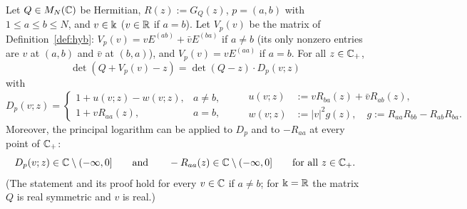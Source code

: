 \begin{lemma}\label{lem:det}
Let $Q\in M_N(\mathbb{C})$ be Hermitian, $R(z):=G_Q(z)$, $p=(a,b)$ with $1\le a\le b\le N$, and $v\in\Bbbk$ ($v\in\mathbb{R}$ if $a=b$). Let $V_p(v)$ be the matrix of
Definition~\ref{def:hyb}: $V_p(v)=vE^{(ab)}+\bar vE^{(ba)}$ if $a\ne b$ (its only nonzero entries are $v$ at $(a,b)$ and $\bar v$ at $(b,a)$), and
$V_p(v)=vE^{(aa)}$ if $a=b$. For all $z\in\mathbb{C}_+$,
\[
\det(Q+V_p(v)-z)=\det(Q-z)\cdot D_p(v;z)
\]
with
\[
D_p(v;z)=\begin{cases}1+u(v;z)-w(v;z),& a\ne b,\\ 1+vR_{aa}(z),& a=b,\end{cases}\qquad
\begin{aligned}u(v;z)&:=vR_{ba}(z)+\bar vR_{ab}(z),\\ w(v;z)&:=|v|^2g(z),\quad g:=R_{aa}R_{bb}-R_{ab}R_{ba}.\end{aligned}
\]
Moreover, the principal logarithm can be applied to $D_p$ and to $-R_{aa}$ at every point of $\mathbb{C}_+$:
\begin{equation}\label{eq:b1:nocut}
D_p(v;z)\in\mathbb{C}\setminus(-\infty,0]\qquad\text{and}\qquad-R_{aa}(z)\in\mathbb{C}\setminus(-\infty,0]\qquad\text{for all }z\in\mathbb{C}_+ .
\end{equation}
\textup{(The statement and its proof hold for every $v\in\mathbb{C}$ if $a\ne b$; for $\Bbbk=\mathbb{R}$ the matrix $Q$ is real symmetric and $v$ is real.)}
\end{lemma}
